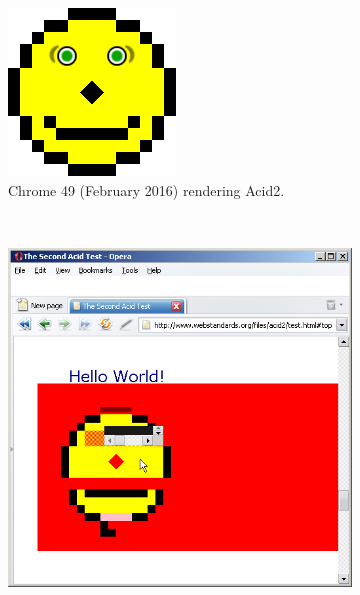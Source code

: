 \documentclass[a4paper, 11pt]{article} %
\begin{document}
\begin{figure}
	\centering
	\begin{subfigure}[b]{0.3\textwidth}
		\includegraphics[width=\textwidth]{acid2}
		\caption{Chrome 49 (February 2016) rendering Acid2.}
		\label{fig:acid2-chrome49}
	\end{subfigure}
	~ %
	\begin{subfigure}[b]{0.3\textwidth}
		\includegraphics[width=\textwidth]{acid2-opera-fail}

\end{subfigure}
\end{figure}
\end{document}
